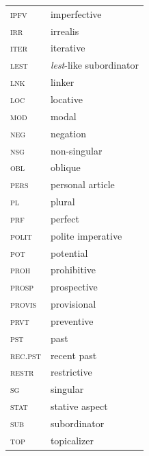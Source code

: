 \documentclass[output=paper,colorlinks,citecolor=brown]{langscibook}
\begin{document}
\begin{tabularx}{.5\textwidth}{@{}lQ@{}}
\textsc{ipfv} & imperfective\\
\textsc{irr} & irrealis \\
\textsc{iter} & iterative\\
\textsc{lest} & \textit{lest}-like subordinator \\
\textsc{lnk} & linker \\
\textsc{loc} & locative \\
\textsc{mod} & modal\\
\textsc{neg} & negation\\
\textsc{nsg} & non-singular\\
\textsc{obl} & oblique\\
\textsc{pers} & personal article \\
\textsc{pl} & plural\\
\textsc{prf} & perfect \\
\textsc{polit} & polite imperative \\
\textsc{pot} & potential\\
\textsc{proh} & prohibitive \\
\textsc{prosp} & prospective \\
\textsc{provis} & provisional\\
\textsc{prvt} & preventive \\
\textsc{pst} & past\\
\textsc{rec.pst} & recent past \\
\textsc{restr} & restrictive \\
\textsc{sg} & singular\\
\textsc{stat} & stative aspect \\
\textsc{sub} & subordinator \\
\textsc{top} & topicalizer \\
\end{tabularx}


\printbibliography[heading=subbibliography,notkeyword=this]
\cleardoublepage
\end{document}
